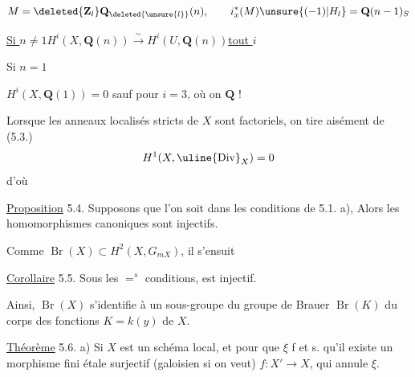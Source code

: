 \[
M=\deleted{\mathbf Z_l}\mathbf Q_{\deleted{\unsure{l}}}(n),\qquad i_x^*(M)\unsure{(-1)|H_l}=\mathbf Q(n-1)_S
\]

\uline{Si $n\neq1$}\qquad $H^i(X,\mathbf Q(n))\xrightarrow{\sim}H^i(U,\mathbf Q(n))$\qquad\uline{tout $i$}

Si $n=1$

$H^i(X,\mathbf Q(1))=0$ sauf pour $i=3$, où on  $\mathbf Q$ !



Lorsque   les anneaux localisés stricts de $X$ sont factoriels, on tire aisément de (5.3.)
\[
H^1(X,\uline{\mathrm{Div}}_X)=0
\]
d'où 

\uline{Proposition} 5.4. Supposons que l'on soit dans les conditions de 5.1. a),  Alors les homomorphismes canoniques
sont injectifs.

Comme $\operatorname{Br}(X)\subset H^2(X,G_{mX})$, il s'ensuit

\uline{Corollaire} 5.5. Sous les $=^{s}$ conditions,
est injectif.

Ainsi, $\operatorname{Br}(X)$ s'identifie  à un sous-groupe du groupe de Brauer $\operatorname{Br}(K)$ du corps des fonctions $K=k(y)$ de $X$.

\uline{Théorème} 5.6. 
a) Si $X$ est un schéma local, et  pour que $\xi$   f et s. qu'il existe un morphisme fini étale surjectif (galoisien si on veut) $f:X'\longrightarrow X$,  qui  annule $\xi$.

